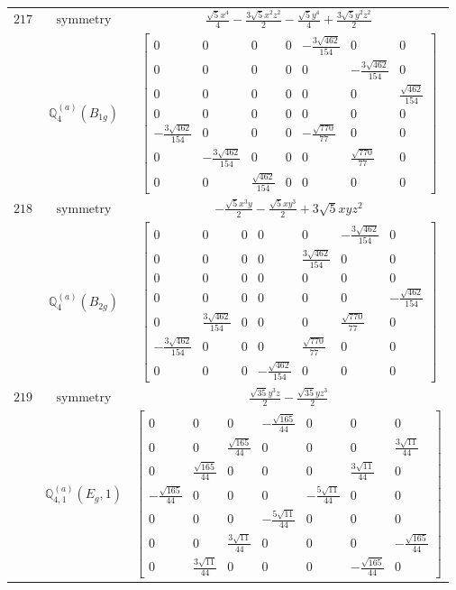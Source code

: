 \documentclass[fleqn,8pt,landscape]{jsarticle}
\begin{document}
\begin{longtable}{ccc}
$ 217 $ & $ \text{symmetry} $ & $ \frac{\sqrt{5} x^{4}}{4} - \frac{3 \sqrt{5} x^{2} z^{2}}{2} - \frac{\sqrt{5} y^{4}}{4} + \frac{3 \sqrt{5} y^{2} z^{2}}{2} $ \\
$  $ & $ \mathbb{Q}_{4}^{(a)}(B_{1g}) $ & $ \begin{bmatrix} 0 & 0 & 0 & 0 & - \frac{3 \sqrt{462}}{154} & 0 & 0 \\ 0 & 0 & 0 & 0 & 0 & - \frac{3 \sqrt{462}}{154} & 0 \\ 0 & 0 & 0 & 0 & 0 & 0 & \frac{\sqrt{462}}{154} \\ 0 & 0 & 0 & 0 & 0 & 0 & 0 \\ - \frac{3 \sqrt{462}}{154} & 0 & 0 & 0 & - \frac{\sqrt{770}}{77} & 0 & 0 \\ 0 & - \frac{3 \sqrt{462}}{154} & 0 & 0 & 0 & \frac{\sqrt{770}}{77} & 0 \\ 0 & 0 & \frac{\sqrt{462}}{154} & 0 & 0 & 0 & 0 \end{bmatrix} $ \\ \hline
$ 218 $ & $ \text{symmetry} $ & $ - \frac{\sqrt{5} x^{3} y}{2} - \frac{\sqrt{5} x y^{3}}{2} + 3 \sqrt{5} x y z^{2} $ \\
$  $ & $ \mathbb{Q}_{4}^{(a)}(B_{2g}) $ & $ \begin{bmatrix} 0 & 0 & 0 & 0 & 0 & - \frac{3 \sqrt{462}}{154} & 0 \\ 0 & 0 & 0 & 0 & \frac{3 \sqrt{462}}{154} & 0 & 0 \\ 0 & 0 & 0 & 0 & 0 & 0 & 0 \\ 0 & 0 & 0 & 0 & 0 & 0 & - \frac{\sqrt{462}}{154} \\ 0 & \frac{3 \sqrt{462}}{154} & 0 & 0 & 0 & \frac{\sqrt{770}}{77} & 0 \\ - \frac{3 \sqrt{462}}{154} & 0 & 0 & 0 & \frac{\sqrt{770}}{77} & 0 & 0 \\ 0 & 0 & 0 & - \frac{\sqrt{462}}{154} & 0 & 0 & 0 \end{bmatrix} $ \\ \hline
$ 219 $ & $ \text{symmetry} $ & $ \frac{\sqrt{35} y^{3} z}{2} - \frac{\sqrt{35} y z^{3}}{2} $ \\
$  $ & $ \mathbb{Q}_{4,1}^{(a)}(E_{g},1) $ & $ \begin{bmatrix} 0 & 0 & 0 & - \frac{\sqrt{165}}{44} & 0 & 0 & 0 \\ 0 & 0 & \frac{\sqrt{165}}{44} & 0 & 0 & 0 & \frac{3 \sqrt{11}}{44} \\ 0 & \frac{\sqrt{165}}{44} & 0 & 0 & 0 & \frac{3 \sqrt{11}}{44} & 0 \\ - \frac{\sqrt{165}}{44} & 0 & 0 & 0 & - \frac{5 \sqrt{11}}{44} & 0 & 0 \\ 0 & 0 & 0 & - \frac{5 \sqrt{11}}{44} & 0 & 0 & 0 \\ 0 & 0 & \frac{3 \sqrt{11}}{44} & 0 & 0 & 0 & - \frac{\sqrt{165}}{44} \\ 0 & \frac{3 \sqrt{11}}{44} & 0 & 0 & 0 & - \frac{\sqrt{165}}{44} & 0 \end{bmatrix} $ \\ \hline

\end{longtable}
\end{document}
